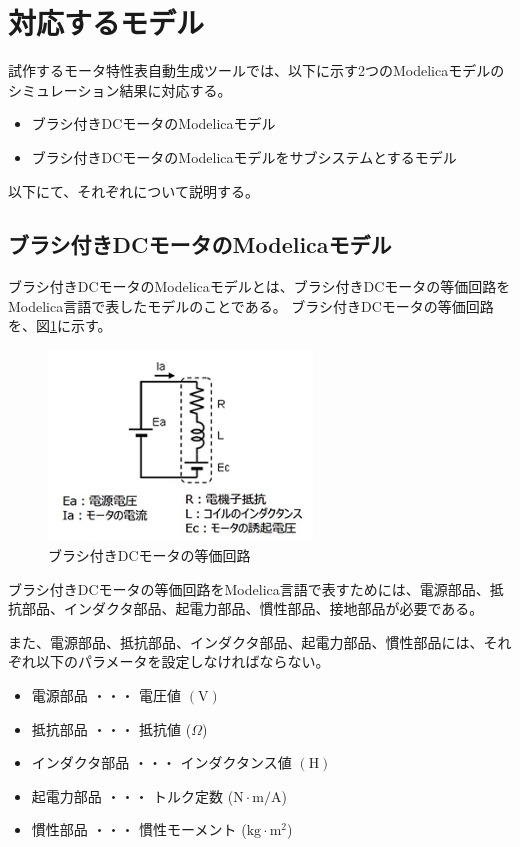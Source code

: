 \section{対応するモデル}\label{taioumodel}
試作するモータ特性表自動生成ツールでは、以下に示す2つのModelicaモデルのシミュレーション結果に対応する。
\begin{itemize}
	\item ブラシ付きDCモータのModelicaモデル
	\item ブラシ付きDCモータのModelicaモデルをサブシステムとするモデル
\end{itemize}
以下にて、それぞれについて説明する。
\subsection{ブラシ付きDCモータのModelicaモデル}\label{sub:tanntai}
ブラシ付きDCモータのModelicaモデルとは、ブラシ付きDCモータの等価回路\cite{等価回路}をModelica言語で表したモデルのことである。
ブラシ付きDCモータの等価回路を、図\ref{fig:touka}に示す。
\begin{figure}[t]
	\centering
	\includegraphics[width=7cm]{./Image/touka.png}
	\caption{ブラシ付きDCモータの等価回路}
	\label{fig:touka}
  \end{figure}
ブラシ付きDCモータの等価回路をModelica言語で表すためには、電源部品、抵抗部品、インダクタ部品、起電力部品、慣性部品、接地部品が必要である。

また、電源部品、抵抗部品、インダクタ部品、起電力部品、慣性部品には、それぞれ以下のパラメータを設定しなければならない。
\begin{itemize}
	\item 電源部品 ・・・ 電圧値 $(\mathrm{V})$
	\item 抵抗部品 ・・・ 抵抗値 ($\Omega$)
	\item インダクタ部品 ・・・ インダクタンス値 $(\mathrm{H})$
	\item 起電力部品 ・・・ トルク定数 ($\mathrm{N\cdot m/A}$)
	\item 慣性部品 ・・・ 慣性モーメント ($\mathrm{kg\cdot m^2}$)
\end{itemize}

